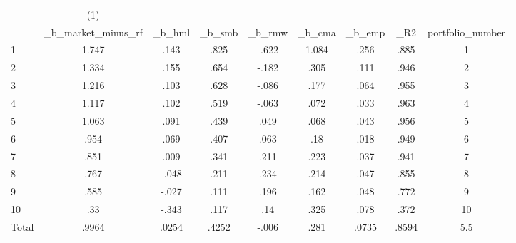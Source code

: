 {
\def\sym#1{\ifmmode^{#1}\else\(^{#1}\)\fi}
\begin{tabular}{l*{1}{cccccccc}}
\hline\hline
            &\multicolumn{1}{c}{(1)}&            &            &            &            &            &            &            \\
            &\_b\_market\_minus\_rf&      \_b\_hml&      \_b\_smb&      \_b\_rmw&      \_b\_cma&      \_b\_emp&         \_R2&portfolio\_number\\
\hline
1           &       1.747&        .143&        .825&       -.622&       1.084&        .256&        .885&           1\\
2           &       1.334&        .155&        .654&       -.182&        .305&        .111&        .946&           2\\
3           &       1.216&        .103&        .628&       -.086&        .177&        .064&        .955&           3\\
4           &       1.117&        .102&        .519&       -.063&        .072&        .033&        .963&           4\\
5           &       1.063&        .091&        .439&        .049&        .068&        .043&        .956&           5\\
6           &        .954&        .069&        .407&        .063&         .18&        .018&        .949&           6\\
7           &        .851&        .009&        .341&        .211&        .223&        .037&        .941&           7\\
8           &        .767&       -.048&        .211&        .234&        .214&        .047&        .855&           8\\
9           &        .585&       -.027&        .111&        .196&        .162&        .048&        .772&           9\\
10          &         .33&       -.343&        .117&         .14&        .325&        .078&        .372&          10\\
Total       &       .9964&       .0254&       .4252&       -.006&        .281&       .0735&       .8594&         5.5\\
\hline\hline
\end{tabular}
}
